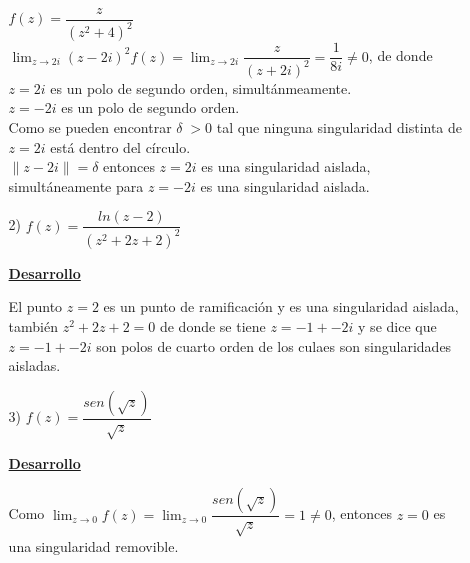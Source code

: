 \documentclass[10pt,a4paper]{article}
\begin{document}
\begin{enumerate}
\begin{itemize}
$f(z) = \dfrac{z}{(z^2 + 4)^2}$\\
$\displaystyle{\lim_{z \to 2 i} (z-2 i)^2 f(z) = \lim_{z \to 2 i} \dfrac{z}{(z + 2i)^2} = \dfrac{1}{8i} \neq 0}$, de donde $z = 2 i$ es un polo de segundo orden, simultánmeamente. \\
$z = -2i$ es un polo de segundo orden.  \\
Como se pueden encontrar $\delta \; > 0$ tal que ninguna singularidad distinta de $z = 2i$ está dentro del círculo. \\
$\parallel z - 2i \parallel = \delta$ entonces $z = 2i$ es una singularidad aislada, simultáneamente para $z = -2i$ es una singularidad aislada. 
\item[2)] $f(z) = \dfrac{ln(z-2)}{(z^2+2z+2)^2}$ \\
\begin{center}
\underline{\textbf{Desarrollo}}
\end{center}
El punto $z = 2$ es un punto de ramificación y es una singularidad aislada, también $z^2+2z+2 = 0$ de donde se tiene $z = -1 +- 2i$ y se dice que $z = -1 +- 2i$ son polos de cuarto orden de los culaes son singularidades aisladas. 
\item[3)] $f(z) = \dfrac{sen(\sqrt{z})}{\sqrt{z}}$ 
\begin{center}
\underline{\textbf{Desarrollo}}
\end{center}
Como $\displaystyle{\lim_{z \to 0} f(z) = \lim_{z \to 0} \dfrac{sen(\sqrt{z})}{\sqrt{z}} = 1 \neq 0}$, entonces $z = 0$ es una singularidad removible.

\end{itemize}
\end{enumerate}
\end{document}
